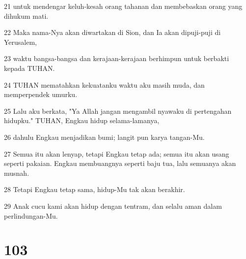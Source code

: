 \par 21 untuk mendengar keluh-kesah orang tahanan dan membebaskan orang yang dihukum mati.
\par 22 Maka nama-Nya akan diwartakan di Sion, dan Ia akan dipuji-puji di Yerusalem,
\par 23 waktu bangsa-bangsa dan kerajaan-kerajaan berhimpun untuk berbakti kepada TUHAN.
\par 24 TUHAN mematahkan kekuatanku waktu aku masih muda, dan memperpendek umurku.
\par 25 Lalu aku berkata, "Ya Allah jangan mengambil nyawaku di pertengahan hidupku." TUHAN, Engkau hidup selama-lamanya,
\par 26 dahulu Engkau menjadikan bumi; langit pun karya tangan-Mu.
\par 27 Semua itu akan lenyap, tetapi Engkau tetap ada; semua itu akan usang seperti pakaian. Engkau membuangnya seperti baju tua, lalu semuanya akan musnah.
\par 28 Tetapi Engkau tetap sama, hidup-Mu tak akan berakhir.
\par 29 Anak cucu kami akan hidup dengan tentram, dan selalu aman dalam perlindungan-Mu.

\chapter{103}

